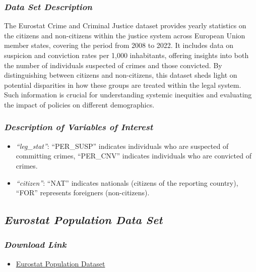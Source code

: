 \documentclass[
]{article}
\providecommand{\tightlist}{%
  \setlength{\itemsep}{0pt}\setlength{\parskip}{0pt}}\usepackage{longtable,booktabs,array}
\begin{document}
\subsubsection{\texorpdfstring{\emph{Data Set
Description}}{Data Set Description}}\label{data-set-description}

The Eurostat Crime and Criminal Justice dataset provides yearly
statistics on the citizens and non-citizens within the justice system
across European Union member states, covering the period from 2008 to
2022. It includes data on suspicion and conviction rates per 1,000
inhabitants, offering insights into both the number of individuals
suspected of crimes and those convicted. By distinguishing between
citizens and non-citizens, this dataset sheds light on potential
disparities in how these groups are treated within the legal system.
Such information is crucial for understanding systemic inequities and
evaluating the impact of policies on different demographics.

\subsubsection{\texorpdfstring{\emph{Description of Variables of
Interest}}{Description of Variables of Interest}}\label{description-of-variables-of-interest}

\begin{itemize}
\tightlist
\item
  \emph{``leg\_stat''}: ``PER\_SUSP'' indicates individuals who are
  suspected of committing crimes, ``PER\_CNV'' indicates individuals who
  are convicted of crimes.
\item
  \emph{``citizen''}: ``NAT'' indicates nationals (citizens of the
  reporting country), ``FOR'' represents foreigners (non-citizens).
\end{itemize}

\subsection{\texorpdfstring{\emph{Eurostat Population Data
Set}}{Eurostat Population Data Set}}\label{eurostat-population-data-set}

\subsubsection{\texorpdfstring{\emph{Download
Link}}{Download Link}}\label{download-link-1}

\begin{itemize}
\tightlist
\item
  \href{https://ec.europa.eu/eurostat/databrowser/view/migr_pop2ctz/default/table?lang=en&category=demo.demo_pop}{Eurostat
  Population Dataset}
\end{itemize}
\end{document}

